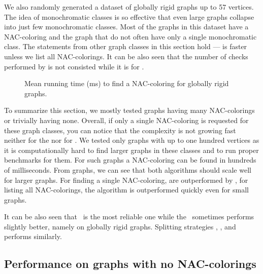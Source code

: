 

We also randomly generated a dataset of globally rigid graphs
up to 57 vertices.
The idea of monochromatic classes is so effective
that even large graphs collapse into just few monochromatic classes.
Most of the graphs in this dataset have a NAC-coloring
and the graph that do not often have only a single monochromatic class.
The statements from other graph classes in this section hold
--- \NaiveCycles{} is faster unless we list all NAC-colorings.
It can be also seen that the number of checks performed
by \NaiveCycles{} is not consisted while it is for \Subgraphs{}.


\begin{figure}[ht]
	\centering
	\scalebox{0.5}{}
	\caption[Running time for globally rigid graphs.]{
		Mean running time (ms) to find a NAC-coloring for globally rigid graphs.}%
	\label{fig:graph_time_globally_rigid}
\end{figure}

To summarize this section, we mostly tested graphs having many NAC-colorings
or trivially having none.
Overall, if only a single NAC-coloring is requested
for these graph classes, you can notice that the complexity
is not growing fast neither for the \NaiveCycles{} nor for \Subgraphs{}.
We tested only graphs with up to one hundred vertices
as it is computationally hard to find larger graphs in these classes
and to run proper benchmarks for them.
For such graphs a NAC-coloring can be found in hundreds of milliseconds.
From graphs, we can see that both algorithms should scale well for larger graphs.
For finding a single NAC-coloring, \Subgraphs{} are outperformed by \NaiveCycles{},
for listing all NAC-colorings, the \NaiveCycles{} algorithm
is outperformed quickly even for small graphs.

It can be also seen that \MergeLinear\ is the most reliable one
while the \SharedVertices\ sometimes performs slightly better,
namely on globally rigid graphs.
%
Splitting strategies \None{}, \CycleMask{}, \Neighbors{} and \NeighborsDegree{}
performs similarly.

\subsection{Performance on graphs with no NAC-colorings}

